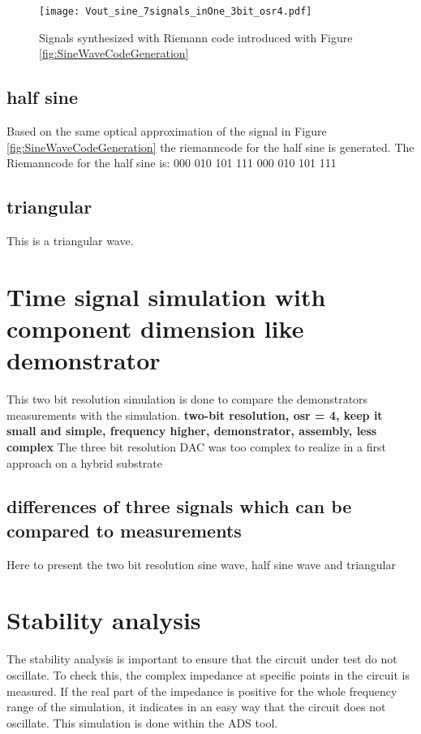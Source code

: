 

\begin{figure}[htb!]
   \centering
   \texttt{[image: Vout\_sine\_7signals\_inOne\_3bit\_osr4.pdf]}
   \caption{Signals synthesized with Riemann code introduced with Figure \ref{fig:SineWaveCodeGeneration}}
   \label{fig:7SignalsSameSlopeInOnePlot}
\end{figure}

\subsection{half sine}
Based on the same optical approximation of the signal in Figure \ref{fig:SineWaveCodeGeneration} the riemanncode for the half sine is generated. The Riemanncode for the half sine is: 000 010 101 111 000 010 101 111
\subsection{triangular}
This is a triangular wave.


\section{Time signal simulation with component dimension like demonstrator}
This two bit resolution simulation is done to compare the demonstrators measurements with the simulation. \textbf{two-bit resolution, osr = 4, keep it small and simple, frequency higher, demonstrator, assembly, less complex} 
The three bit resolution DAC was too complex to realize in a first approach on a hybrid substrate
\subsection{differences of three signals which can be compared to measurements}
Here to present the two bit resolution sine wave, half sine wave and triangular



\section{Stability analysis}
The stability analysis is important to ensure that the circuit under test do not oscillate. 
 To check this, the complex impedance at specific points in the circuit is measured.
 If the real part of the impedance is positive for the whole frequency range of the simulation, it indicates in an easy way that the circuit does not oscillate.
This simulation is done within the ADS tool. 

